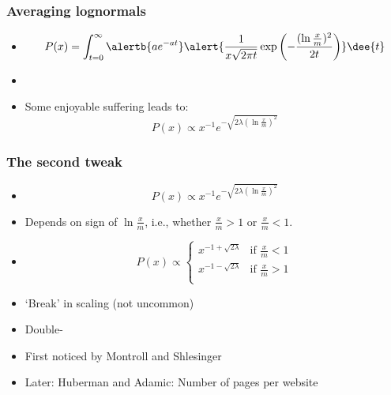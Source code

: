 \begin{frame}
  \frametitle{Averaging lognormals}

  \begin{block}{}
    \begin{itemize}
    \item<1->
      $$
      P(x) = \int_{t=0}^\infty
      \alertb{a e^{-at}}
      \alert{
        \frac{1}{x \sqrt{2\pi t}}
        \exp
        \left(
          -\frac{(\ln \frac{x}{m})^2}
          {2t}
        \right)
      }
      \dee{t}
      $$
    \item<2->
    \item<3->
      Some enjoyable suffering leads to:
      $$
      P(x)
      \propto
      x^{-1} e^{- \sqrt{2\lambda (\ln \frac{x}{m}) ^2}} 
      $$
    \end{itemize}
  \end{block}

\end{frame}

\begin{frame}
  \frametitle{The second tweak}

  \begin{block}{}
  \begin{itemize}
  \item<1-> $$
    P(x)
    \propto
    x^{-1} e^{- \sqrt{2\lambda (\ln \frac{x}{m}) ^2}} 
    $$
  \item<2-> Depends on sign of $\ln \frac{x}{m}$, i.e., whether $\frac{x}{m}>1$ or $\frac{x}{m}<1$.
  \item<3-> 
    $$
    P(x) 
    \propto
    \left\{
      \begin{array}{cl}
        x^{-1 + \sqrt{2\lambda}} & \mbox{if $\frac{x}{m}<1$} \\
        x^{-1 - \sqrt{2\lambda}} & \mbox{if $\frac{x}{m}>1$} \\
      \end{array}
    \right.
    $$
  \item<4-> \alert{`Break' in scaling} (not uncommon)
  \item<5-> Double-
  \item<6->
    First noticed by Montroll and Shlesinger\cite{montroll1982a,montroll1983a}
  \item<7-> 
    Later: Huberman and Adamic\cite{huberman1999a,huberman2000a}: Number of pages per website
  \end{itemize}
  \end{block}

\end{frame}

